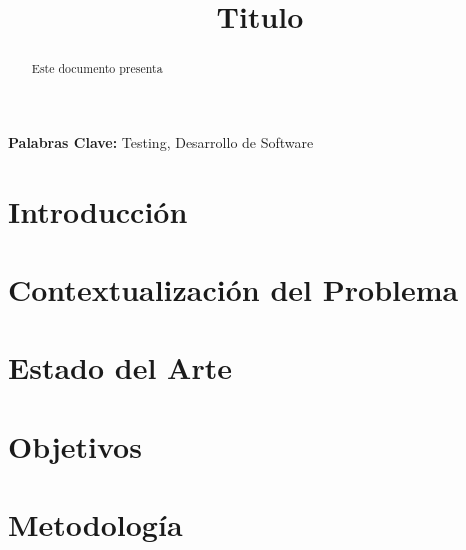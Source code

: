\documentclass[conference]{IEEEtran}
\title{Titulo}
\author{
\IEEEauthorblockN{
Rodrigo G. Fernández\IEEEauthorrefmark{1}
}
\IEEEauthorblockA{
\IEEEauthorrefmark{1}Computer Systems Research Group~\cite{CSRG}, Universidad Técnica Federico Santa María, Av. ~España~1680, Valparaíso, Chile
}
}
\begin{document}

\pagestyle{empty}

\maketitle\thispagestyle{empty}

\begin{abstract}
Este documento presenta
\end{abstract}

\textbf{Palabras Clave:} Testing, Desarrollo de Software

\section{Introducción}
\label{sec:intro}


\section{Contextualización del Problema}
\label{sec:definicion}


\section{Estado del Arte}
\label{sec:estado}


\section{Objetivos}
\label{sec:objetivos}


\section{Metodología}
\label{sec:metodo}

\end{document}
